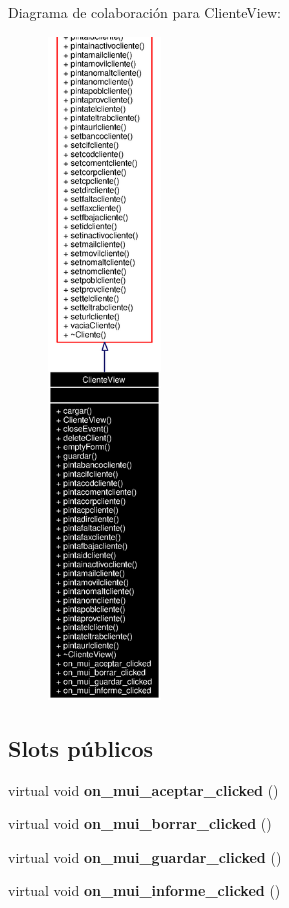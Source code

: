 Diagrama de colaboraci\'{o}n para Cliente\-View:\begin{figure}[H]
\begin{center}
\leavevmode
\includegraphics[width=85pt]{classClienteView__coll__graph}
\end{center}
\end{figure}
\subsection*{Slots p\'{u}blicos}
\begin{CompactItemize}
\item 
virtual void {\bf on\_\-mui\_\-aceptar\_\-clicked} ()\label{classClienteView_i0}

\item 
virtual void {\bf on\_\-mui\_\-borrar\_\-clicked} ()\label{classClienteView_i1}

\item 
virtual void {\bf on\_\-mui\_\-guardar\_\-clicked} ()\label{classClienteView_i2}

\item 
virtual void {\bf on\_\-mui\_\-informe\_\-clicked} ()\label{classClienteView_i3}

\end{CompactItemize}
